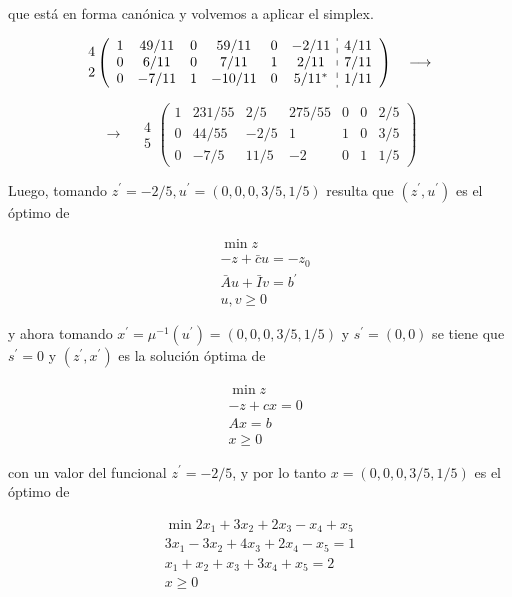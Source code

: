 \documentclass[10pt]{article}
\begin{document}
que está en forma canónica y volvemos a aplicar el simplex.

$$
\begin{aligned}
& 4 \\
& 2
\end{aligned}\left(\begin{array}{cccccc:c}
1 & 49 / 11 & 0 & 59 / 11 & 0 & -2 / 11 & 4 / 11 \\
0 & 6 / 11 & 0 & 7 / 11 & 1 & 2 / 11 & 7 / 11 \\
0 & -7 / 11 & 1 & -10 / 11 & 0 & 5 / 11^{*} & 1 / 11
\end{array}\right) \quad \longrightarrow
$$

$$
\longrightarrow \quad \begin{gathered}
4 \\
5
\end{gathered}\left(\begin{array}{cccccc|c}
1 & 231 / 55 & 2 / 5 & 275 / 55 & 0 & 0 & 2 / 5 \\
0 & 44 / 55 & -2 / 5 & 1 & 1 & 0 & 3 / 5 \\
0 & -7 / 5 & 11 / 5 & -2 & 0 & 1 & 1 / 5
\end{array}\right)
$$

Luego, tomando $z^{\prime}=-2 / 5, u^{\prime}=(0,0,0,3 / 5,1 / 5)$ resulta que $\left(z^{\prime}, u^{\prime}\right)$ es el óptimo de

$$
\begin{aligned}
& \min z \\
& -z+\bar{c} u=-z_{0} \\
& \bar{A} u+\bar{I} v=b^{\prime} \\
& u, v \geq 0
\end{aligned}
$$

y ahora tomando $x^{\prime}=\mu^{-1}\left(u^{\prime}\right)=(0,0,0,3 / 5,1 / 5)$ y $s^{\prime}=(0,0)$ se tiene que $s^{\prime}=0$ y $\left(z^{\prime}, x^{\prime}\right)$ es la solución óptima de

$$
\begin{aligned}
& \min z \\
& -z+c x=0 \\
& A x=b \\
& x \geq 0
\end{aligned}
$$

con un valor del funcional $z^{\prime}=-2 / 5$, y por lo tanto $x=(0,0,0,3 / 5,1 / 5)$ es el óptimo de

$$
\begin{gathered}
\min 2 x_{1}+3 x_{2}+2 x_{3}-x_{4}+x_{5} \\
3 x_{1}-3 x_{2}+4 x_{3}+2 x_{4}-x_{5}=1 \\
x_{1}+x_{2}+x_{3}+3 x_{4}+x_{5}=2 \\
x \geq 0
\end{gathered}
$$
\end{document}

